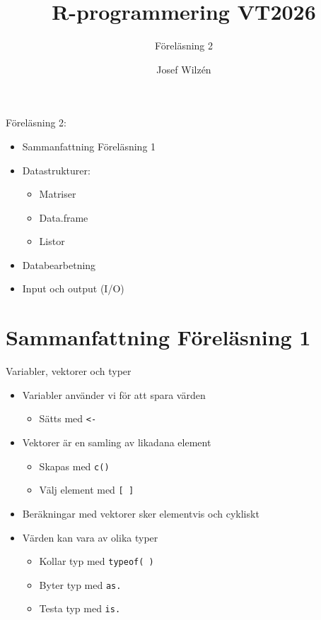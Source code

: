\documentclass[
  11pt,
  ignorenonframetext,
]{beamer}
\title{R-programmering VT2026}
\subtitle{Föreläsning 2}
\author{Josef Wilzén}
\date{}
\institute{Linköpings Universitet}
\providecommand{\tightlist}{%
  \setlength{\itemsep}{0pt}\setlength{\parskip}{0pt}}
\begin{document}
\frame{\titlepage}

\begin{frame}{Föreläsning 2:}
\label{fuxf6reluxe4sning-2}
\begin{itemize}
\tightlist
\item
  Sammanfattning Föreläsning 1
\item
  Datastrukturer:

  \begin{itemize}
  \tightlist
  \item
    Matriser
  \item
    Data.frame
  \item
    Listor
  \end{itemize}
\item
  Databearbetning
\item
  Input och output (I/O)
\end{itemize}
\end{frame}

\section{Sammanfattning Föreläsning
1}\label{sammanfattning-fuxf6reluxe4sning-1}

\begin{frame}{Variabler, vektorer och typer}
\label{variabler-vektorer-och-typer}
\begin{itemize}
\tightlist
\item
  Variabler använder vi för att spara värden

  \begin{itemize}
  \tightlist
  \item
    Sätts med \texttt{<-}
  \end{itemize}
\item
  Vektorer är en samling av likadana element

  \begin{itemize}
  \tightlist
  \item
    Skapas med \texttt{c()}
  \item
    Välj element med \texttt{[ ]}
  \end{itemize}
\item
  Beräkningar med vektorer sker elementvis och cykliskt
\item
  Värden kan vara av olika typer

  \begin{itemize}
  \tightlist
  \item
    Kollar typ med \texttt{typeof( )}
  \item
    Byter typ med \texttt{as.}
  \item
    Testa typ med \texttt{is.}
  \end{itemize}
\end{itemize}
\end{frame}
\end{document}
